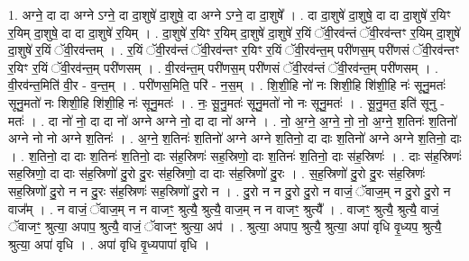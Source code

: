 \documentclass[17pt]{extarticle}
\begin{document}
1. अग्ने॒ दा दा अग्ने ऽग्ने॒ दा दा॒शुषे॑ दा॒शुषे॒ दा अग्ने ऽग्ने॒ दा दा॒शुषे᳚ । . दा दा॒शुषे॑ दा॒शुषे॒ दा दा दा॒शुषे॑ र॒यिꣳ र॒यिम् दा॒शुषे॒ दा दा दा॒शुषे॑ र॒यिम् । . दा॒शुषे॑ र॒यिꣳ र॒यिम् दा॒शुषे॑ दा॒शुषे॑ र॒यिं ॅवी॒रव॑न्तं ॅवी॒रव॑न्तꣳ र॒यिम् दा॒शुषे॑ दा॒शुषे॑ र॒यिं ॅवी॒रव॑न्तम् । . र॒यिं ॅवी॒रव॑न्तं ॅवी॒रव॑न्तꣳ र॒यिꣳ र॒यिं ॅवी॒रव॑न्त॒म् परी॑णस॒म् परी॑णसं ॅवी॒रव॑न्तꣳ र॒यिꣳ र॒यिं ॅवी॒रव॑न्त॒म् परी॑णसम् । . वी॒रव॑न्त॒म् परी॑णस॒म् परी॑णसं ॅवी॒रव॑न्तं ॅवी॒रव॑न्त॒म् परी॑णसम् । . वी॒रव॑न्त॒मिति॑ वी॒र - व॒न्त॒म् । . परी॑णस॒मिति॒ परि॑ - न॒स॒म् । . शि॒शी॒हि नो॑ नः शिशी॒हि शि॑शी॒हि नः॑ सूनु॒मतः॑ सूनु॒मतो॑ नः शिशी॒हि शि॑शी॒हि नः॑ सूनु॒मतः॑ । . नः॒ सू॒नु॒मतः॑ सूनु॒मतो॑ नो नः सूनु॒मतः॑ । . सू॒नु॒मत॒ इति॑ सूनु - मतः॑ । . दा नो॑ नो॒ दा दा नो॑ अग्ने अग्ने नो॒ दा दा नो॑ अग्ने । . नो॒ अ॒ग्ने॒ अ॒ग्ने॒ नो॒ नो॒ अ॒ग्ने॒ श॒तिनः॑ श॒तिनो॑ अग्ने नो नो अग्ने श॒तिनः॑ । . अ॒ग्ने॒ श॒तिनः॑ श॒तिनो॑ अग्ने अग्ने श॒तिनो॒ दा दाः श॒तिनो॑ अग्ने अग्ने श॒तिनो॒ दाः । . श॒तिनो॒ दा दाः श॒तिनः॑ श॒तिनो॒ दाः स॑ह॒स्रिणः॑ सह॒स्रिणो॒ दाः श॒तिनः॑ श॒तिनो॒ दाः स॑ह॒स्रिणः॑ । . दाः स॑ह॒स्रिणः॑ सह॒स्रिणो॒ दा दाः स॑ह॒स्रिणो॑ दु॒रो दु॒रः स॑ह॒स्रिणो॒ दा दाः स॑ह॒स्रिणो॑ दु॒रः । . स॒ह॒स्रिणो॑ दु॒रो दु॒रः स॑ह॒स्रिणः॑ सह॒स्रिणो॑ दु॒रो न न दु॒रः स॑ह॒स्रिणः॑ सह॒स्रिणो॑ दु॒रो न । . दु॒रो न न दु॒रो दु॒रो न वाजं॒ ॅवाज॒म् न दु॒रो दु॒रो न वाज᳚म् । . न वाजं॒ ॅवाज॒म् न न वाजꣳ॒॒ श्रुत्यै॒ श्रुत्यै॒ वाज॒म् न न वाजꣳ॒॒ श्रुत्यै᳚ । . वाजꣳ॒॒ श्रुत्यै॒ श्रुत्यै॒ वाजं॒ ॅवाजꣳ॒॒ श्रुत्या॒ अपाप॒ श्रुत्यै॒ वाजं॒ ॅवाजꣳ॒॒ श्रुत्या॒ अप॑ । . श्रुत्या॒ अपाप॒ श्रुत्यै॒ श्रुत्या॒ अपा॑ वृधि वृ॒ध्यप॒ श्रुत्यै॒ श्रुत्या॒ अपा॑ वृधि । . अपा॑ वृधि वृ॒ध्यपापा॑ वृधि । \newline
\end{document}
